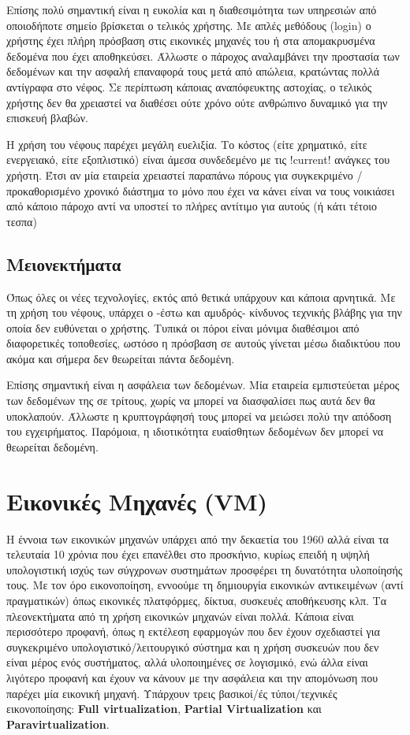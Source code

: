 Επίσης πολύ σημαντική είναι η ευκολία και η διαθεσιμότητα των υπηρεσιών από
οποιοδήποτε σημείο βρίσκεται ο τελικός χρήστης. Με απλές μεθόδους (login) ο
χρήστης έχει πλήρη πρόσβαση στις εικονικές μηχανές του ή στα απομακρυσμένα
δεδομένα που έχει αποθηκεύσει. Άλλωστε ο πάροχος αναλαμβάνει την προστασία των
δεδομένων και την ασφαλή επαναφορά τους μετά από απώλεια, κρατώντας πολλά αντίγραφα
στο νέφος. Σε περίπτωση κάποιας αναπόφευκτης αστοχίας, ο τελικός χρήστης δεν
θα χρειαστεί να διαθέσει ούτε χρόνο ούτε ανθρώπινο δυναμικό για την επισκευή
βλαβών.

Η χρήση του νέφους παρέχει μεγάλη ευελιξία. Το κόστος (είτε χρηματικό, είτε
ενεργειακό, είτε εξοπλιστικό) είναι άμεσα συνδεδεμένο με τις !current! ανάγκες
του χρήστη. Έτσι αν μία εταιρεία χρειαστεί παραπάνω πόρους για συγκεκριμένο /
προκαθορισμένο χρονικό διάστημα το μόνο που έχει να κάνει είναι να τους
νοικιάσει από κάποιο πάροχο αντί να υποστεί το πλήρες αντίτιμο για αυτούς (ή
κάτι τέτοιο τεσπα)

\subsection{Μειονεκτήματα}
Όπως όλες οι νέες τεχνολογίες, εκτός από θετικά υπάρχουν και κάποια αρνητικά. Με
τη χρήση του νέφους, υπάρχει ο -έστω και αμυδρός- κίνδυνος τεχνικής βλάβης για
την οποία δεν ευθύνεται ο χρήστης. Τυπικά οι πόροι είναι μόνιμα διαθέσιμοι
από διαφορετικές τοποθεσίες, ωστόσο η πρόσβαση σε αυτούς γίνεται μέσω
διαδικτύου που ακόμα και σήμερα δεν θεωρείται πάντα δεδομένη.

Επίσης σημαντική είναι η ασφάλεια των δεδομένων. Μία εταιρεία εμπιστεύεται μέρος
των δεδομένων της σε τρίτους, χωρίς να μπορεί να διασφαλίσει πως αυτά δεν θα
υποκλαπούν. Άλλωστε η κρυπτογράφησή τους μπορεί να μειώσει πολύ την απόδοση του
εγχειρήματος. Παρόμοια, η ιδιοτικότητα ευαίσθητων δεδομένων δεν μπορεί να
θεωρείται δεδομένη.

\section{Εικονικές Μηχανές (VM)}
Η έννοια των εικονικών μηχανών υπάρχει από την δεκαετία του 1960 αλλά είναι τα
τελευταία 10 χρόνια που έχει επανέλθει στο προσκήνιο, κυρίως επειδή η υψηλή
υπολογιστική ισχύς των σύγχρονων συστημάτων προσφέρει τη δυνατότητα υλοποίησής
τους. Με τον όρο εικονοποίηση, εννοούμε τη δημιουργία εικονικών αντικειμένων
(αντί πραγματικών) όπως εικονικές πλατφόρμες, δίκτυα, συσκευές αποθήκευσης κλπ.
Τα πλεονεκτήματα από τη χρήση εικονικών μηχανών είναι πολλά. Κάποια είναι
περισσότερο  προφανή, όπως η εκτέλεση εφαρμογών που δεν έχουν σχεδιαστεί για
συγκεκριμένο υπολογιστικό/λειτουργικό σύστημα και η χρήση συσκευών που δεν είναι
μέρος ενός συστήματος, αλλά υλοποιημένες σε λογισμικό, ενώ άλλα είναι λιγότερο
προφανή και έχουν να κάνουν με την ασφάλεια και την απομόνωση που παρέχει μία
εικονική μηχανή.
Υπάρχουν τρεις βασικοί/ές τύποι/τεχνικές εικονοποίησης: \textbf{Full
virtualization}, \textbf{Partial Virtualization} και \textbf{Paravirtualization}.

